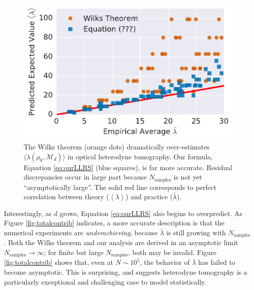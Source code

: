 \documentclass[aps,pra, twocolumn]{revtex4-1}
\newcommand{\M}{\mathcal{M}}
\newcommand{\expect}[1]{\ensuremath{\left\langle#1\right\rangle}}
\begin{document}
\begin{figure}[h]
 \includegraphics[width=\columnwidth]{Images/Figure_8.pdf}
 \caption{The Wilks theorem (orange dots) dramatically over-estimates $\langle\lambda(\rho_{0}, \M_{d})\rangle$ in optical heterodyne tomography. Our formula, Equation \ref{eq:ourLLRS} (blue squares), is far more accurate. Residual discrepancies occur in large part because $N_{\mathrm{samples}}$ is not yet ``asymptotically large''. The solid red line corresponds to perfect correlation between theory ($\expect{\lambda}$) and practice ($\bar\lambda$).}
 \label{fig:modelcomp}
\end{figure}

Interestingly, as $d$ grows, Equation \eqref{eq:ourLLRS} also begins to overpredict. As Figure \ref{fig:totalcontrib} indicates, a more accurate description is that the numerical experiments are \emph{underachieving}, because $\bar\lambda$ is still growing with $N_{\mathrm{samples}}$.  Both the Wilks theorem and our analysis are derived in an asymptotic limit $N_{\mathrm{samples}} \rightarrow \infty$; for finite but large $N_{\mathrm{samples}}$, both may be invalid.  Figure \ref{fig:totalcontrib} shows that, even at $N\sim 10^{5}$, the behavior of $\bar{\lambda}$ has failed to become asymptotic. This is surprising, and suggests heterodyne tomography is a particularly exceptional and challenging case to model statistically. 
\end{document}
